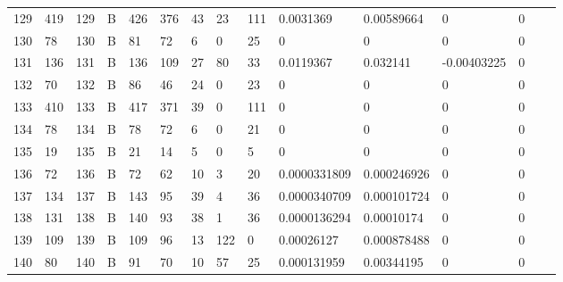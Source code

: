 \begin{longtable}{lllllllllllllll}
	129 & 419               & 129 & B   & 426               & 376               & 43                & 23   & 111        & 0.0031369      & 0.00589664     & 0             & 0            \\
	130 & 78                & 130 & B   & 81                & 72                & 6                 & 0    & 25         & 0              & 0              & 0             & 0            \\
	131 & 136               & 131 & B   & 136               & 109               & 27                & 80   & 33         & 0.0119367      & 0.032141       & -0.00403225   & 0            \\
	132 & 70                & 132 & B   & 86                & 46                & 24                & 0    & 23         & 0              & 0              & 0             & 0            \\
	133 & 410               & 133 & B   & 417               & 371               & 39                & 0    & 111        & 0              & 0              & 0             & 0            \\
	134 & 78                & 134 & B   & 78                & 72                & 6                 & 0    & 21         & 0              & 0              & 0             & 0            \\
	135 & 19                & 135 & B   & 21                & 14                & 5                 & 0    & 5          & 0              & 0              & 0             & 0            \\
	136 & 72                & 136 & B   & 72                & 62                & 10                & 3    & 20         & 0.0000331809   & 0.000246926    & 0             & 0            \\
	137 & 134               & 137 & B   & 143               & 95                & 39                & 4    & 36         & 0.0000340709   & 0.000101724    & 0             & 0            \\
	138 & 131               & 138 & B   & 140               & 93                & 38                & 1    & 36         & 0.0000136294   & 0.00010174     & 0             & 0            \\
	139 & 109               & 139 & B   & 109               & 96                & 13                & 122  & 0          & 0.00026127     & 0.000878488    & 0             & 0            \\
	140 & 80                & 140 & B   & 91                & 70                & 10                & 57   & 25         & 0.000131959    & 0.00344195     & 0             & 0            \\

\end{longtable}
